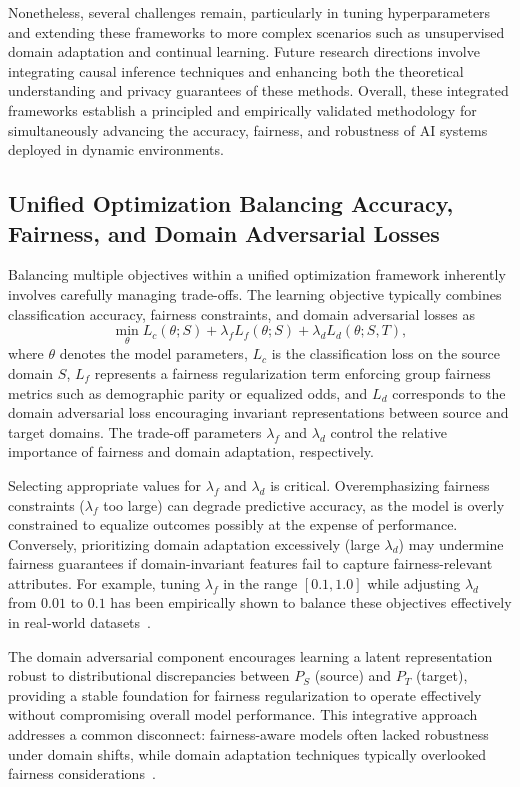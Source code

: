 \documentclass[sigconf]{acmart}
\begin{document}
Nonetheless, several challenges remain, particularly in tuning hyperparameters and extending these frameworks to more complex scenarios such as unsupervised domain adaptation and continual learning. Future research directions involve integrating causal inference techniques and enhancing both the theoretical understanding and privacy guarantees of these methods. Overall, these integrated frameworks establish a principled and empirically validated methodology for simultaneously advancing the accuracy, fairness, and robustness of AI systems deployed in dynamic environments.

\subsection{Unified Optimization Balancing Accuracy, Fairness, and Domain Adversarial Losses}

Balancing multiple objectives within a unified optimization framework inherently involves carefully managing trade-offs. The learning objective typically combines classification accuracy, fairness constraints, and domain adversarial losses as 
\[
\min_{\theta} L_c(\theta; S) + \lambda_f L_f(\theta; S) + \lambda_d L_d(\theta; S, T),
\]
where \(\theta\) denotes the model parameters, \(L_c\) is the classification loss on the source domain \(S\), \(L_f\) represents a fairness regularization term enforcing group fairness metrics such as demographic parity or equalized odds, and \(L_d\) corresponds to the domain adversarial loss encouraging invariant representations between source and target domains. The trade-off parameters \(\lambda_f\) and \(\lambda_d\) control the relative importance of fairness and domain adaptation, respectively.

Selecting appropriate values for \(\lambda_f\) and \(\lambda_d\) is critical. Overemphasizing fairness constraints (\(\lambda_f\) too large) can degrade predictive accuracy, as the model is overly constrained to equalize outcomes possibly at the expense of performance. Conversely, prioritizing domain adaptation excessively (large \(\lambda_d\)) may undermine fairness guarantees if domain-invariant features fail to capture fairness-relevant attributes. For example, tuning \(\lambda_f\) in the range \([0.1, 1.0]\) while adjusting \(\lambda_d\) from \(0.01\) to \(0.1\) has been empirically shown to balance these objectives effectively in real-world datasets~\cite{ref26}.

The domain adversarial component encourages learning a latent representation robust to distributional discrepancies between \(P_S\) (source) and \(P_T\) (target), providing a stable foundation for fairness regularization to operate effectively without compromising overall model performance. This integrative approach addresses a common disconnect: fairness-aware models often lacked robustness under domain shifts, while domain adaptation techniques typically overlooked fairness considerations~\cite{ref26}.
\end{document}
